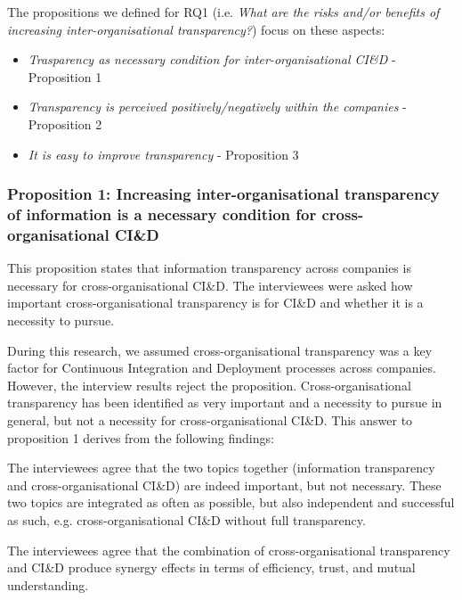 The propositions we defined for  
RQ1 (i.e. {\em What are the risks and/or benefits of increasing inter-organisational transparency?}) focus on these aspects:

\begin{itemize}
\item {\em Trasparency as necessary condition for  inter-organisational CI\&D}  - Proposition 1 %
\item {\em Transparency is perceived positively/negatively within the companies} - Proposition 2 %
\item {\em It is easy to improve transparency} - Proposition 3 %
\end{itemize}

\subsubsection{Proposition 1: Increasing inter-organisational transparency of information is a necessary condition for cross-organisational CI\&D}

This proposition states that information transparency across companies is necessary for cross-organisational CI\&D. The interviewees were asked how important cross-orga\-ni\-sa\-tional transparency is for CI\&D and whether it is a necessity to pursue. 

During this research, we assumed cross-organisational transparency was a key factor for Continuous Integration and Deployment processes across companies. However, the interview results reject the proposition. Cross-organisational transparency has been identified as very important and a necessity to pursue in general, but not a necessity for cross-organisational CI\&D. This answer to proposition 1 derives from the following findings:

 The interviewees agree that the two topics together (information transparency and cross-organisational CI\&D) are indeed important, but not necessary. These two topics are integrated as often as possible, but also independent and successful as such, e.g. cross-organisational CI\&D without full transparency.

 The interviewees agree that the combination of cross-organisational transparency and CI\&D produce synergy effects in terms of efficiency, trust, and mutual understanding.

